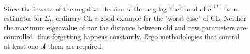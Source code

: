 Since the inverse of the negative Hessian of the neg-log likelihood of $\hat{w}^{(t)}$ is an estimator for $\Sigma_t$, ordinary CL a good example for the "worst case" of CL. Neither the maximum eigenvalue of nor the distance between old and new parameters are controlled, thus forgetting happens constantly. Ergo methodologies that control at least one of them are required.